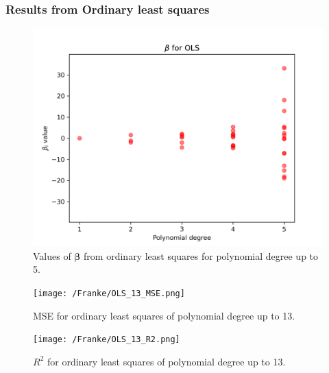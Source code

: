 \documentclass{article}
\begin{document}
\subsubsection{Results from Ordinary least squares}
\begin{figure}[htbp]
    \centering
    \includegraphics[width=\textwidth*2/3]{Terrain/OLS_5_betas.png}
    \caption{Values of $\boldsymbol{\beta}$ from ordinary least squares for polynomial degree up to 5.}
    \label{fig:TerrainOLS5Beta}
\end{figure}

\begin{figure}[htbp]
    \centering
    \texttt{[image: /Franke/OLS\_13\_MSE.png]}
    \caption{MSE for ordinary least squares of polynomial degree up to 13.}
    \label{fig:TerrainOLS5MSE}
\end{figure}

\begin{figure}[htbp]
    \centering
    \texttt{[image: /Franke/OLS\_13\_R2.png]}
    \caption{$R^2$ for ordinary least squares of polynomial degree up to 13.}
    \label{fig:TerrainOLS5R2}
\end{figure}
\end{document}
